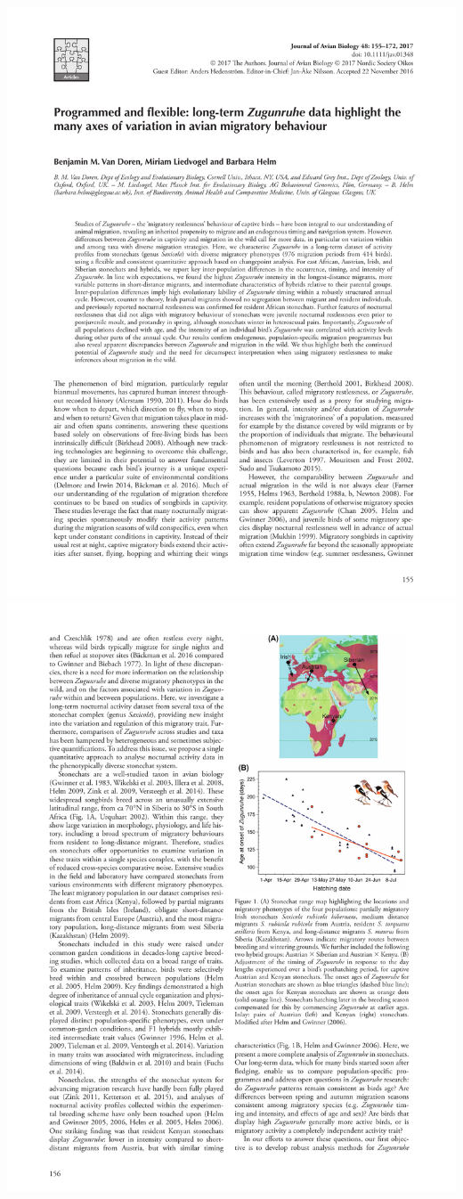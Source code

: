 \documentclass[a4paper, twoside]{templates/ociamthesis}
\begin{document}
\includegraphics[width=1\linewidth]{pdf_chapters/zug/zug_crop_Part01}
\includegraphics[width=1\linewidth]{pdf_chapters/zug/zug_crop_Part02}
\end{document}
